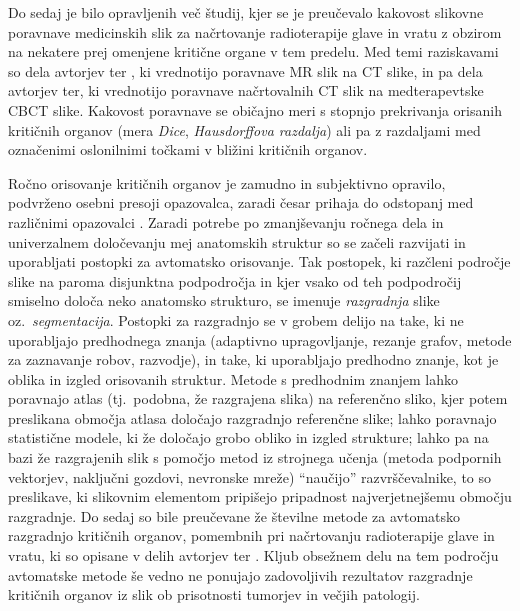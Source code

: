 \documentclass[a4paper,twoside,11pt]{article}
\begin{document}
	\par{
	  Do sedaj je bilo opravljenih več študij, kjer se je preučevalo kakovost slikovne poravnave medicinskih slik za načrtovanje radioterapije glave in vratu z obzirom na nekatere prej omenjene kritične organe v tem predelu. Med temi raziskavami so dela avtorjev \cite{sohn2008,castadot2008,duboisdaische2007,brouwer2014,leibfarth2013,fortunati2014} ter \cite{webster2009}, ki vrednotijo poravnave MR slik na CT slike, in pa dela avtorjev \cite{hou2011,mencarelli2014} ter\cite{veiga2014}, ki vrednotijo poravnave načrtovalnih CT slik na medterapevtske CBCT slike. Kakovost poravnave se običajno meri s stopnjo prekrivanja orisanih kritičnih organov (mera \emph{Dice}, \emph{Hausdorffova razdalja}) ali pa z razdaljami med označenimi oslonilnimi točkami v bližini kritičnih organov.
	}
	\par{
	  Ročno orisovanje kritičnih organov je zamudno \citep{harari2010} in subjektivno opravilo, podvrženo osebni presoji opazovalca, zaradi česar prihaja do odstopanj med različnimi opazovalci \citep{brouwer2012}.  Zaradi potrebe po zmanjševanju ročnega dela in univerzalnem določevanju mej anatomskih struktur so se začeli razvijati in uporabljati postopki za avtomatsko orisovanje. Tak postopek, ki razčleni področje slike na paroma disjunktna podpodročja in kjer vsako od teh podpodročij smiselno določa neko anatomsko strukturo, se imenuje \emph{razgradnja} slike oz.~\emph{segmentacija}. Postopki za razgradnjo se v grobem delijo na take, ki ne uporabljajo predhodnega znanja (adaptivno upragovljanje, rezanje grafov, metode za zaznavanje robov, razvodje), in take, ki uporabljajo predhodno znanje, kot je oblika in izgled orisovanih struktur. Metode s predhodnim znanjem lahko poravnajo atlas (tj.~podobna, že razgrajena slika) na referenčno sliko, kjer potem preslikana območja atlasa določajo razgradnjo referenčne slike; lahko poravnajo statistične modele, ki že določajo grobo obliko in izgled strukture; lahko pa na bazi že razgrajenih slik s pomočjo metod iz strojnega učenja (metoda podpornih vektorjev, naključni gozdovi, nevronske mreže) ``naučijo'' razvrščevalnike, to so preslikave, ki slikovnim elementom pripišejo pripadnost najverjetnejšemu območju razgradnje. Do sedaj so bile preučevane že številne metode za avtomatsko razgradnjo kritičnih organov, pomembnih pri načrtovanju radioterapije glave in vratu, ki so opisane v delih avtorjev \cite{han2008, commowick2008, voet2011, daisne2013, bondiau2005, isambert2008, sims2009, fritscher2014, teguh2011, fortunati2013, verhaart2014, wachinger2015, hoangduc2015, fortunati2015, chen2010, teng2010, yang2014, qazi2011, commowick2008a, deeley2011, leavens2008, ibragimov2015, yan2004, dornheim2007, bekes2008, gorthi2009, faggiano2011, mattiucci2013, verhaart2014a, thariat2012, peroni2012, lamacchia2012, thomson2014, chen2012, tao2015, stapleford2010, ibragimov2017} ter \cite{zhang2007}. Kljub obsežnem delu na tem področju avtomatske metode še vedno ne ponujajo zadovoljivih rezultatov razgradnje kritičnih organov iz slik ob prisotnosti tumorjev in večjih patologij.
	}
	  
\end{document}
